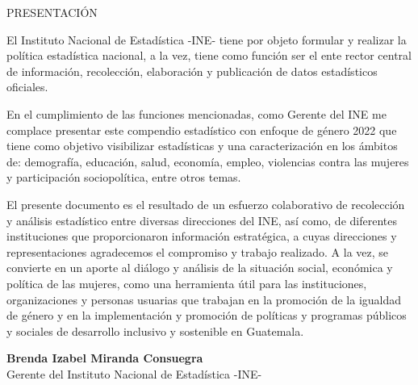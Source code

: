 $\ $\\[3cm]
\begin{center}
{\Bold \LARGE PRESENTACIÓN}\\[2cm]
\end{center}

El Instituto Nacional de Estadística -INE- tiene por objeto formular y realizar la política estadística nacional, a la vez, tiene como función ser el ente rector central de información, recolección, elaboración y publicación de datos estadísticos oficiales.  

En el cumplimiento de las funciones mencionadas, como Gerente del INE me complace presentar este compendio estadístico con enfoque de género 2022 que tiene como objetivo visibilizar estadísticas y una caracterización en los ámbitos de: demografía, educación, salud, economía, empleo, violencias contra las mujeres y participación sociopolítica, entre otros temas. 

El presente documento es el resultado de un esfuerzo colaborativo de recolección y análisis estadístico entre diversas direcciones del INE, así como, de diferentes instituciones que proporcionaron información estratégica, a cuyas direcciones y representaciones agradecemos el compromiso y trabajo realizado. A la vez, se convierte en un aporte al diálogo y análisis de la situación social, económica y política de las mujeres, como una herramienta útil para las instituciones, organizaciones y personas usuarias que trabajan en la promoción de la igualdad de género y en la implementación y promoción de políticas y programas públicos y sociales de desarrollo inclusivo y sostenible en Guatemala.\\[1cm]

\begin{center}
\textbf{Brenda Izabel Miranda Consuegra}\\
Gerente del Instituto Nacional de Estadística -INE-
\end{center}

